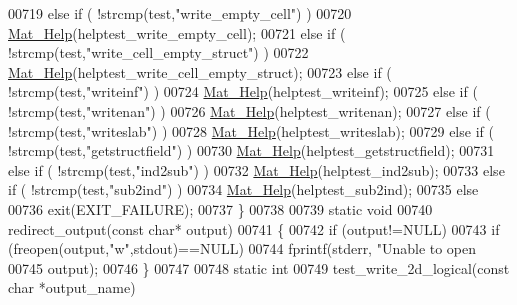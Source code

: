 \begin{DoxyCode}
{{00719     \textcolor{keywordflow}{else} \textcolor{keywordflow}{if} ( !strcmp(test,\textcolor{stringliteral}{"write\_empty\_cell"}) )
00720         \hyperlink{group__mat__util_gaa4039c185e807ed2e9682b66fe2ea331}{Mat\_Help}(helptest\_write\_empty\_cell);
00721     \textcolor{keywordflow}{else} \textcolor{keywordflow}{if} ( !strcmp(test,\textcolor{stringliteral}{"write\_cell\_empty\_struct"}) )
00722         \hyperlink{group__mat__util_gaa4039c185e807ed2e9682b66fe2ea331}{Mat\_Help}(helptest\_write\_cell\_empty\_struct);
00723     \textcolor{keywordflow}{else} \textcolor{keywordflow}{if} ( !strcmp(test,\textcolor{stringliteral}{"writeinf"}) )
00724         \hyperlink{group__mat__util_gaa4039c185e807ed2e9682b66fe2ea331}{Mat\_Help}(helptest\_writeinf);
00725     \textcolor{keywordflow}{else} \textcolor{keywordflow}{if} ( !strcmp(test,\textcolor{stringliteral}{"writenan"}) )
00726         \hyperlink{group__mat__util_gaa4039c185e807ed2e9682b66fe2ea331}{Mat\_Help}(helptest\_writenan);
00727     \textcolor{keywordflow}{else} \textcolor{keywordflow}{if} ( !strcmp(test,\textcolor{stringliteral}{"writeslab"}) )
00728         \hyperlink{group__mat__util_gaa4039c185e807ed2e9682b66fe2ea331}{Mat\_Help}(helptest\_writeslab);
00729     \textcolor{keywordflow}{else} \textcolor{keywordflow}{if} ( !strcmp(test,\textcolor{stringliteral}{"getstructfield"}) )
00730         \hyperlink{group__mat__util_gaa4039c185e807ed2e9682b66fe2ea331}{Mat\_Help}(helptest\_getstructfield);
00731     \textcolor{keywordflow}{else} \textcolor{keywordflow}{if} ( !strcmp(test,\textcolor{stringliteral}{"ind2sub"}) )
00732         \hyperlink{group__mat__util_gaa4039c185e807ed2e9682b66fe2ea331}{Mat\_Help}(helptest\_ind2sub);
00733     \textcolor{keywordflow}{else} \textcolor{keywordflow}{if} ( !strcmp(test,\textcolor{stringliteral}{"sub2ind"}) )
00734         \hyperlink{group__mat__util_gaa4039c185e807ed2e9682b66fe2ea331}{Mat\_Help}(helptest\_sub2ind);
00735     \textcolor{keywordflow}{else}
00736         exit(EXIT\_FAILURE);
00737 \}
00738 
00739 \textcolor{keyword}{static} \textcolor{keywordtype}{void}
00740 redirect\_output(\textcolor{keyword}{const} \textcolor{keywordtype}{char}* output)
00741 \{
00742     \textcolor{keywordflow}{if} (output!=NULL)
00743         \textcolor{keywordflow}{if} (freopen(output,\textcolor{stringliteral}{"w"},stdout)==NULL)
00744             fprintf(stderr, \textcolor{stringliteral}{"Unable to open %
00745                 output);
00746 \}
00747 
00748 \textcolor{keyword}{static} \textcolor{keywordtype}{int}
00749 test\_write\_2d\_logical(\textcolor{keyword}{const} \textcolor{keywordtype}{char} *output\_name)
}}}
\end{DoxyCode}
